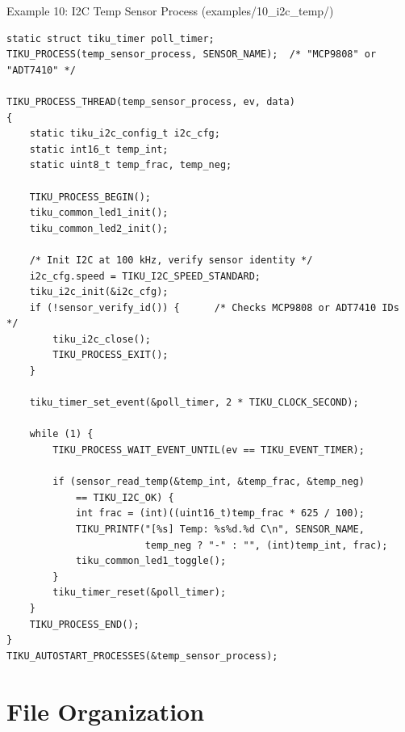 \documentclass[aspectratio=169, 10pt]{beamer}
\begin{document}
\begin{frame}[fragile]{Example 10: I2C Temp Sensor Process (examples/10\_i2c\_temp/)}
\begin{lstlisting}[style=cstyle, basicstyle=\ttfamily\tiny,
  title={Periodic I2C temperature read --- sensor selected at compile time}]
static struct tiku_timer poll_timer;
TIKU_PROCESS(temp_sensor_process, SENSOR_NAME);  /* "MCP9808" or "ADT7410" */

TIKU_PROCESS_THREAD(temp_sensor_process, ev, data)
{
    static tiku_i2c_config_t i2c_cfg;
    static int16_t temp_int;
    static uint8_t temp_frac, temp_neg;

    TIKU_PROCESS_BEGIN();
    tiku_common_led1_init();
    tiku_common_led2_init();

    /* Init I2C at 100 kHz, verify sensor identity */
    i2c_cfg.speed = TIKU_I2C_SPEED_STANDARD;
    tiku_i2c_init(&i2c_cfg);
    if (!sensor_verify_id()) {      /* Checks MCP9808 or ADT7410 IDs */
        tiku_i2c_close();
        TIKU_PROCESS_EXIT();
    }

    tiku_timer_set_event(&poll_timer, 2 * TIKU_CLOCK_SECOND);

    while (1) {
        TIKU_PROCESS_WAIT_EVENT_UNTIL(ev == TIKU_EVENT_TIMER);

        if (sensor_read_temp(&temp_int, &temp_frac, &temp_neg)
            == TIKU_I2C_OK) {
            int frac = (int)((uint16_t)temp_frac * 625 / 100);
            TIKU_PRINTF("[%s] Temp: %s%d.%d C\n", SENSOR_NAME,
                        temp_neg ? "-" : "", (int)temp_int, frac);
            tiku_common_led1_toggle();
        }
        tiku_timer_reset(&poll_timer);
    }
    TIKU_PROCESS_END();
}
TIKU_AUTOSTART_PROCESSES(&temp_sensor_process);
\end{lstlisting}
\end{frame}

\section{File Organization}
\end{document}
